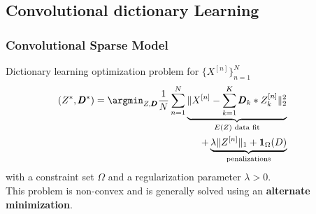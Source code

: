 \documentclass[prez_parietal.tex]{subfiles}
\begin{document}
\subsection{Convolutional dictionary Learning}
\begin{frame}[t]
\frametitle{Convolutional Sparse Model}
Dictionary learning optimization problem for $\{X^{[n]}\}_{n=1}^N$ 
\[\hskip-2em\begin{split}
	(Z^*, \pmb D^*) = \argmin_{Z, \pmb D}\frac{1}{N}\sum_{n=1}^N
			\underbrace{\| X^{[n]} - \sum_{k=1}^K\pmb D_k *  Z_k^{[n]}\|_2^2
						}_{E(Z) \text{ data fit}}\\
			+ \underbrace{\lambda\| Z^{[n]}\|_1 + \textbf{1}_{\Omega}(D)
						}_{\text{penalizations}}
\end{split}\]
with a constraint set $\Omega$ and a regularization parameter $\lambda > 0$.\\[1em]
This problem is non-convex and is generally solved using an \textbf{alternate minimization}.\\[.5em]
\end{frame}

\end{document}
